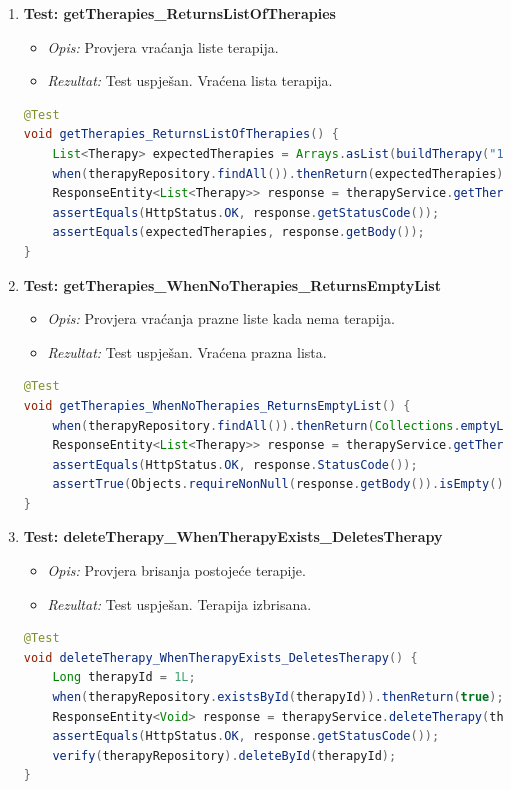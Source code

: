 			\begin{enumerate}
				\item \textbf{Test: getTherapies\_ReturnsListOfTherapies}
				\begin{itemize}
					\item \textit{Opis:} Provjera vraćanja liste terapija.
					\item \textit{Rezultat:} Test uspješan. Vraćena lista terapija.
				\end{itemize}
\begin{lstlisting}[language=Java]
@Test
void getTherapies_ReturnsListOfTherapies() {
	List<Therapy> expectedTherapies = Arrays.asList(buildTherapy("1"), buildTherapy("2"));
	when(therapyRepository.findAll()).thenReturn(expectedTherapies);
	ResponseEntity<List<Therapy>> response = therapyService.getTherapies();
	assertEquals(HttpStatus.OK, response.getStatusCode());
	assertEquals(expectedTherapies, response.getBody());
}
\end{lstlisting}
					
				\item \textbf{Test: getTherapies\_WhenNoTherapies\_ReturnsEmptyList}
				\begin{itemize}
					\item \textit{Opis:} Provjera vraćanja prazne liste kada nema terapija.
					\item \textit{Rezultat:} Test uspješan. Vraćena prazna lista.
				\end{itemize}

\begin{lstlisting}[language=Java]
@Test
void getTherapies_WhenNoTherapies_ReturnsEmptyList() {
	when(therapyRepository.findAll()).thenReturn(Collections.emptyList());
	ResponseEntity<List<Therapy>> response = therapyService.getTherapies();
	assertEquals(HttpStatus.OK, response.StatusCode());
	assertTrue(Objects.requireNonNull(response.getBody()).isEmpty());
}
\end{lstlisting}
					
				\item \textbf{Test: deleteTherapy\_WhenTherapyExists\_DeletesTherapy}
				\begin{itemize}
					\item \textit{Opis:} Provjera brisanja postojeće terapije.
					\item \textit{Rezultat:} Test uspješan. Terapija izbrisana.
				\end{itemize}

\begin{lstlisting}[language=Java]
@Test
void deleteTherapy_WhenTherapyExists_DeletesTherapy() {
	Long therapyId = 1L;
	when(therapyRepository.existsById(therapyId)).thenReturn(true);
	ResponseEntity<Void> response = therapyService.deleteTherapy(therapyId);
	assertEquals(HttpStatus.OK, response.getStatusCode());
	verify(therapyRepository).deleteById(therapyId);
}
\end{lstlisting}
					

\end{enumerate}
